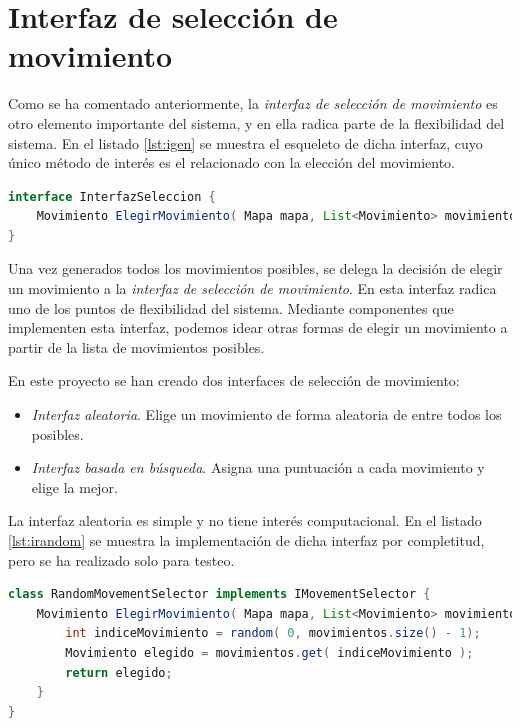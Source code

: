\section{Interfaz de selección de movimiento}

Como se ha comentado anteriormente, la \emph{interfaz de selección de movimiento} es otro elemento importante del sistema, y en ella radica parte de la flexibilidad del sistema. En el listado \ref{lst:igen} se muestra el esqueleto de dicha interfaz, cuyo único método de interés es el relacionado con la elección del movimiento.

\begin{lstlisting}[caption={Interfaz de selección de movimiento},label={lst:igen},language=Java,escapechar=|]
interface InterfazSeleccion {
	Movimiento ElegirMovimiento( Mapa mapa, List<Movimiento> movimientos );
}
\end{lstlisting}

Una vez generados todos los movimientos posibles, se delega la decisión de elegir un movimiento a la \emph{interfaz de selección de movimiento}. En esta interfaz radica uno de los puntos de flexibilidad del sistema. Mediante componentes que implementen esta interfaz, podemos idear otras formas de elegir un movimiento a partir de la lista de movimientos posibles.

En este proyecto se han creado dos interfaces de selección de movimiento:

\begin{itemize}
	\item \emph{Interfaz aleatoria}. Elige un movimiento de forma aleatoria de entre todos los posibles.
	\item \emph{Interfaz basada en búsqueda}. Asigna una puntuación a cada movimiento y elige la mejor.
\end{itemize}

La interfaz aleatoria es simple y no tiene interés computacional. En el listado \ref{lst:irandom} se muestra la implementación de dicha interfaz por completitud, pero se ha realizado solo para testeo.

\begin{lstlisting}[caption={Implementación aleatoria de la interfaz de selección de movimiento},label={lst:irandom},language=Java,escapechar=|]
class RandomMovementSelector implements IMovementSelector {
	Movimiento ElegirMovimiento( Mapa mapa, List<Movimiento> movimientos ) {
		int indiceMovimiento = random( 0, movimientos.size() - 1);
		Movimiento elegido = movimientos.get( indiceMovimiento );
		return elegido;
	}
}
\end{lstlisting}

